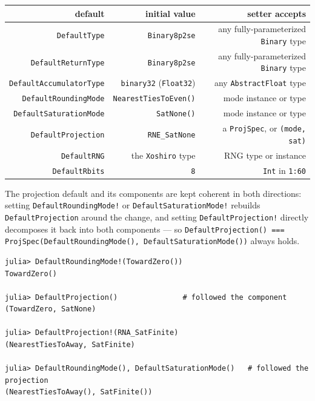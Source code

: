 \begin{table}[h]
\centering
\begin{tabulary}{\linewidth}{R R R}
\toprule
default & initial value & setter accepts \\
\toprule
\texttt{DefaultType} & \texttt{Binary8p2se} & any fully-parameterized \texttt{Binary} type \\
\texttt{DefaultReturnType} & \texttt{Binary8p2se} & any fully-parameterized \texttt{Binary} type \\
\texttt{DefaultAccumulatorType} & \texttt{binary32} (\texttt{Float32}) & any \texttt{AbstractFloat} type \\
\texttt{DefaultRoundingMode} & \texttt{NearestTiesToEven()} & mode instance or type \\
\texttt{DefaultSaturationMode} & \texttt{SatNone()} & mode instance or type \\
\texttt{DefaultProjection} & \texttt{RNE\_SatNone} & a \texttt{ProjSpec}, or \texttt{(mode, sat)} \\
\texttt{DefaultRNG} & the \texttt{Xoshiro} type & RNG type or instance \\
\texttt{DefaultRbits} & \texttt{8} & \texttt{Int} in \texttt{1:60} \\
\bottomrule
\end{tabulary}

\end{table}



The projection default and its components are kept coherent in both directions: setting \texttt{DefaultRoundingMode!} or \texttt{DefaultSaturationMode!} rebuilds \texttt{DefaultProjection} around the change, and setting \texttt{DefaultProjection!} directly decomposes it back into both components — so \texttt{DefaultProjection() === ProjSpec(DefaultRoundingMode(), DefaultSaturationMode())} always holds.




\begin{verbatim}
julia> DefaultRoundingMode!(TowardZero())
TowardZero()

julia> DefaultProjection()               # followed the component
(TowardZero, SatNone)

julia> DefaultProjection!(RNA_SatFinite)
(NearestTiesToAway, SatFinite)

julia> DefaultRoundingMode(), DefaultSaturationMode()   # followed the projection
(NearestTiesToAway(), SatFinite())
\end{verbatim}



